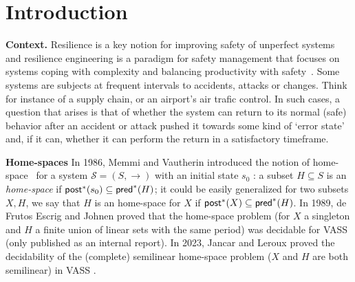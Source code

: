 \section{Introduction}\label{section introduction}


{\bf Context.} 
Resilience is a key notion for improving safety of unperfect systems and resilience engineering is a paradigm for safety management that focuses on systems coping with complexity and balancing productivity with safety~\cite{challenges}. Some systems are subjects at frequent intervals to accidents, attacks or changes. Think for instance of a supply chain, or an airport’s air trafic control. In such cases, a question that arises is that of whether the system can return to its normal (safe) behavior after an accident or attack
pushed it towards some kind of ‘error state’ and, if it can, whether it can perform the return in a satisfactory timeframe. 
%


{\bf Home-spaces}
 In 1986, Memmi and Vautherin introduced the notion of home-space~\cite{DBLP:conf/ac/MemmiV86} for a system $\mathscr{S} = (S,\rightarrow )$ with an initial state $s_0$ : a subset $H \subseteq S$ is an \emph{home-space}  if 
$\textsf{post}^*(s_0) \subseteq \textsf{pred}^*(H)$; it could be easily generalized for two subsets $X,H$, we say that $H$ is an home-space for $X$ if $\textsf{post}^*(X) \subseteq \textsf{pred}^*(H)$. In 1989, de Frutos Escrig and Johnen proved that the home-space problem (for $X$ a singleton and $H$ a finite union of linear sets with the same period) was decidable for VASS (only published as an internal report). In 2023, Jancar and Leroux proved the decidability of the (complete) semilinear home-space problem ($X$ and $H$ are both semilinear)  in VASS \cite{DBLP:journals/corr/abs-2207-02697}.

